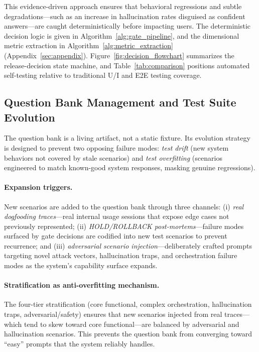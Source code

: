 This evidence-driven approach ensures that behavioral regressions and subtle degradations---such as an increase in hallucination rates disguised as confident answers---are caught deterministically before impacting users. The deterministic decision logic is given in Algorithm~\ref{alg:gate_pipeline}, and the dimensional metric extraction in Algorithm~\ref{alg:metric_extraction} (Appendix~\ref{sec:appendix}).
Figure~\ref{fig:decision_flowchart} summarizes the release-decision state machine, and Table~\ref{tab:comparison} positions automated self-testing relative to traditional U/I and E2E testing coverage.





\subsection{Question Bank Management and Test Suite Evolution}
\label{sec:qbank_management}

The question bank is a living artifact, not a static fixture. Its evolution strategy is designed to prevent two opposing failure modes: \textit{test drift} (new system behaviors not covered by stale scenarios) and \textit{test overfitting} (scenarios engineered to match known-good system responses, masking genuine regressions).

\paragraph{Expansion triggers.}
New scenarios are added to the question bank through three channels: (i) \textit{real dogfooding traces}---real internal usage sessions that expose edge cases not previously represented; (ii) \textit{HOLD\slash ROLLBACK post-mortems}---failure modes surfaced by gate decisions are codified into new test scenarios to prevent recurrence; and (iii) \textit{adversarial scenario injection}---deliberately crafted prompts targeting novel attack vectors, hallucination traps, and orchestration failure modes as the system's capability surface expands.

\paragraph{Stratification as anti-overfitting mechanism.}
The four-tier stratification (core functional, complex orchestration, hallucination traps, adversarial/safety) ensures that new scenarios injected from real traces---which tend to skew toward core functional---are balanced by adversarial and hallucination scenarios. This prevents the question bank from converging toward ``easy'' prompts that the system reliably handles.

